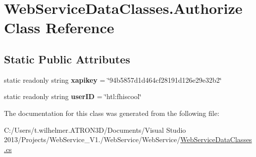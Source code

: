 \hypertarget{class_web_service_data_classes_1_1_authorize}{}\section{Web\+Service\+Data\+Classes.\+Authorize Class Reference}
\label{class_web_service_data_classes_1_1_authorize}
\subsection*{Static Public Attributes}
\begin{DoxyCompactItemize}
\item 
\hypertarget{class_web_service_data_classes_1_1_authorize_a5b90af82031e600705fd16cc76ea288e}{}static readonly string {\bfseries xapikey} = \char`\"{}94b5857d1d464cf28191d126e29e32b2\char`\"{}\label{class_web_service_data_classes_1_1_authorize_a5b90af82031e600705fd16cc76ea288e}

\item 
\hypertarget{class_web_service_data_classes_1_1_authorize_a0f9a92d46f9254162ce3eeb34d7f6d41}{}static readonly string {\bfseries user\+I\+D} = \char`\"{}htl\+:fhiscool\char`\"{}\label{class_web_service_data_classes_1_1_authorize_a0f9a92d46f9254162ce3eeb34d7f6d41}

\end{DoxyCompactItemize}


The documentation for this class was generated from the following file\+:\begin{DoxyCompactItemize}
\item 
C\+:/\+Users/t.\+wilhelmer.\+A\+T\+R\+O\+N3\+D/\+Documents/\+Visual Studio 2013/\+Projects/\+Web\+Service\+\_\+\+V1./\+Web\+Service/\+Web\+Service/\hyperlink{_web_service_data_classes_8cs}{Web\+Service\+Data\+Classes.\+cs}\end{DoxyCompactItemize}
